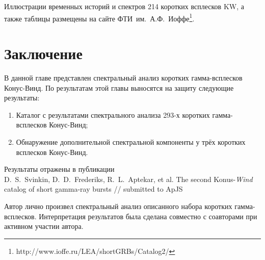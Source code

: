 Иллюстрации временных историй и спектров 214 коротких всплесков KW, а также таблицы размещены на сайте
ФТИ~им.~А.Ф.~Иоффе\footnote{http://www.ioffe.ru/LEA/shortGRBs/Catalog2/}.

\section{Заключение}
В данной главе представлен спектральный анализ коротких гамма-всплесков Конус-Винд.
По результатам этой главы выносятся на защиту следующие результаты:
\begin{enumerate}
\item Каталог с результатами спектрального анализа 293-х коротких гамма-всплесков Конус-Винд;
\item Обнаружение дополнительной спектральной компоненты у трёх коротких всплесков Конус-Винд.
\end{enumerate}

Результаты отражены в публикации \\
D.~S.~Svinkin, D.~D.~Frederiks, R.~L.~Aptekar, et al. 
The second Konus-\textit{Wind} catalog of short gamma-ray bursts //
submitted to ApJS

Автор лично произвел спектральный анализ описанного набора коротких гамма-всплесков.
Интерпретация результатов была сделана совместно с соавторами при активном участии автора.

\clearpage